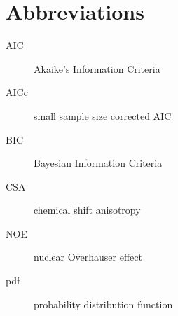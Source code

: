 \documentclass[a4paper, 11pt, twoside, openright]{book}
\newenvironment{spacedpara}{\setlength{\parindent}{0pt} \setlength{\parskip}{2ex plus 0.5ex minus 0.2ex}}{}
\begin{document}

\tableofcontents



\listoffigures






\chapter*{Abbreviations}

\begin{description}

\item[AIC]  Akaike's Information Criteria
\item[AICc]  small sample size corrected AIC
\item[BIC]  Bayesian Information Criteria
\item[CSA]  chemical shift anisotropy
\item[NOE]  nuclear Overhauser effect
\item[pdf]  probability distribution function

\end{description}




\mainmatter
\begin{spacedpara}





















\end{spacedpara}










\printindex
\end{document}
